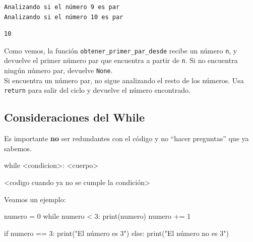\documentclass[
  letterpaper,
  DIV=11,
  numbers=noendperiod]{scrreprt}
\newenvironment{Shaded}{\begin{snugshade}}{\end{snugshade}}
\newcommand{\BuiltInTok}[1]{\textcolor[rgb]{0.00,0.23,0.31}{#1}}
\newcommand{\ControlFlowTok}[1]{\textcolor[rgb]{0.00,0.23,0.31}{#1}}
\newcommand{\DecValTok}[1]{\textcolor[rgb]{0.68,0.00,0.00}{#1}}
\newcommand{\NormalTok}[1]{\textcolor[rgb]{0.00,0.23,0.31}{#1}}
\newcommand{\OperatorTok}[1]{\textcolor[rgb]{0.37,0.37,0.37}{#1}}
\newcommand{\StringTok}[1]{\textcolor[rgb]{0.13,0.47,0.30}{#1}}
\begin{document}
\begin{verbatim}
Analizando si el número 9 es par
Analizando si el número 10 es par
\end{verbatim}

\begin{verbatim}
10
\end{verbatim}

Como vemos, la función \texttt{obtener\_primer\_par\_desde} recibe un
número \texttt{n}, y devuelve el primer número par que encuentra a
partir de \texttt{n}. Si no encuentra ningún número par, devuelve
\texttt{None}.\\
Si encuentra un número par, no sigue analizando el resto de los números.
Usa \texttt{return} para salir del ciclo y devuelve el número
encontrado.

\hypertarget{consideraciones-del-while}{%
\subsection{Consideraciones del While}\label{consideraciones-del-while}}

Es importante \textbf{no} ser redundantes con el código y no ``hacer
preguntas'' que ya sabemos.

\begin{Shaded}
\begin{Highlighting}[]
\ControlFlowTok{while} \OperatorTok{\textless{}}\NormalTok{condicion}\OperatorTok{\textgreater{}}\NormalTok{:}
  \OperatorTok{\textless{}}\NormalTok{cuerpo}\OperatorTok{\textgreater{}}

\OperatorTok{\textless{}}\NormalTok{codigo cuando ya no se cumple la condición}\OperatorTok{\textgreater{}}
\end{Highlighting}
\end{Shaded}

Veamos un ejemplo:

\begin{Shaded}
\begin{Highlighting}[]
\NormalTok{numero }\OperatorTok{=} \DecValTok{0}
\ControlFlowTok{while}\NormalTok{ numero }\OperatorTok{\textless{}} \DecValTok{3}\NormalTok{:}
  \BuiltInTok{print}\NormalTok{(numero)}
\NormalTok{  numero }\OperatorTok{+=} \DecValTok{1}

\ControlFlowTok{if}\NormalTok{ numero }\OperatorTok{==} \DecValTok{3}\NormalTok{:}
  \BuiltInTok{print}\NormalTok{(}\StringTok{"El número es 3"}\NormalTok{)}
\ControlFlowTok{else}\NormalTok{:}
  \BuiltInTok{print}\NormalTok{(}\StringTok{"El número no es 3"}\NormalTok{)}
\end{Highlighting}
\end{Shaded}
\end{document}
